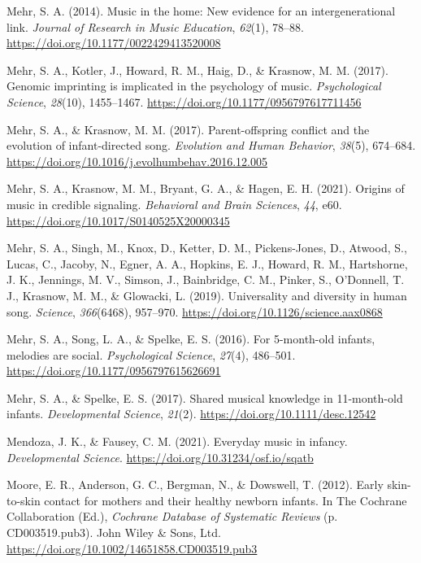 \documentclass[
]{article}
\newlength{\cslhangindent}
\newenvironment{CSLReferences}[2] %
 {\begin{list}{}{%
  \setlength{\itemindent}{0pt}
  \setlength{\leftmargin}{0pt}
  \setlength{\parsep}{0pt}
  \ifodd #1
   \setlength{\leftmargin}{\cslhangindent}
   \setlength{\itemindent}{-1\cslhangindent}
  \fi
  \setlength{\itemsep}{#2\baselineskip}}}
 {\end{list}}
\begin{document}
\begin{CSLReferences}{1}{0}
Mehr, S. A. (2014). Music in the home: {New} evidence for an
intergenerational link. \emph{Journal of Research in Music Education},
\emph{62}(1), 78--88. \url{https://doi.org/10.1177/0022429413520008}

Mehr, S. A., Kotler, J., Howard, R. M., Haig, D., \& Krasnow, M. M.
(2017). Genomic imprinting is implicated in the psychology of music.
\emph{Psychological Science}, \emph{28}(10), 1455--1467.
\url{https://doi.org/10.1177/0956797617711456}

Mehr, S. A., \& Krasnow, M. M. (2017). Parent-offspring conflict and the
evolution of infant-directed song. \emph{Evolution and Human Behavior},
\emph{38}(5), 674--684.
\url{https://doi.org/10.1016/j.evolhumbehav.2016.12.005}

Mehr, S. A., Krasnow, M. M., Bryant, G. A., \& Hagen, E. H. (2021).
Origins of music in credible signaling. \emph{Behavioral and Brain
Sciences}, \emph{44}, e60.
\url{https://doi.org/10.1017/S0140525X20000345}

Mehr, S. A., Singh, M., Knox, D., Ketter, D. M., Pickens-Jones, D.,
Atwood, S., Lucas, C., Jacoby, N., Egner, A. A., Hopkins, E. J., Howard,
R. M., Hartshorne, J. K., Jennings, M. V., Simson, J., Bainbridge, C.
M., Pinker, S., O'Donnell, T. J., Krasnow, M. M., \& Glowacki, L.
(2019). Universality and diversity in human song. \emph{Science},
\emph{366}(6468), 957--970.
\url{https://doi.org/10.1126/science.aax0868}

Mehr, S. A., Song, L. A., \& Spelke, E. S. (2016). For 5-month-old
infants, melodies are social. \emph{Psychological Science},
\emph{27}(4), 486--501. \url{https://doi.org/10.1177/0956797615626691}

Mehr, S. A., \& Spelke, E. S. (2017). Shared musical knowledge in
11-month-old infants. \emph{Developmental Science}, \emph{21}(2).
\url{https://doi.org/10.1111/desc.12542}

Mendoza, J. K., \& Fausey, C. M. (2021). Everyday music in infancy.
\emph{Developmental Science}.
\url{https://doi.org/10.31234/osf.io/sqatb}

Moore, E. R., Anderson, G. C., Bergman, N., \& Dowswell, T. (2012).
Early skin-to-skin contact for mothers and their healthy newborn
infants. In The Cochrane Collaboration (Ed.), \emph{Cochrane {Database}
of {Systematic Reviews}} (p. CD003519.pub3). John Wiley \& Sons, Ltd.
\url{https://doi.org/10.1002/14651858.CD003519.pub3}


\end{CSLReferences}
\end{document}
